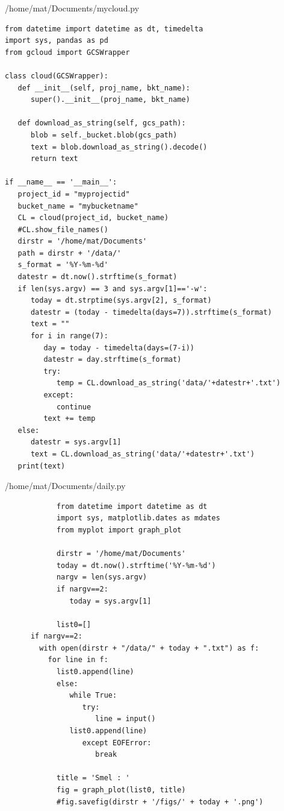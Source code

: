 \documentclass[12pt,a4j]{jsbook}
\begin{document}
\begin{spacing}{0.87}
\begin{itembox}[l]{/home/mat/Documents/mycloud.py}
\begin{verbatim}
from datetime import datetime as dt, timedelta
import sys, pandas as pd
from gcloud import GCSWrapper

class cloud(GCSWrapper):
   def __init__(self, proj_name, bkt_name):
      super().__init__(proj_name, bkt_name)

   def download_as_string(self, gcs_path):
      blob = self._bucket.blob(gcs_path)
      text = blob.download_as_string().decode()
      return text

if __name__ == '__main__':
   project_id = "myprojectid"
   bucket_name = "mybucketname"
   CL = cloud(project_id, bucket_name)
   #CL.show_file_names()
   dirstr = '/home/mat/Documents'
   path = dirstr + '/data/'
   s_format = '%Y-%m-%d'
   datestr = dt.now().strftime(s_format)
   if len(sys.argv) == 3 and sys.argv[1]=='-w':
      today = dt.strptime(sys.argv[2], s_format)
      datestr = (today - timedelta(days=7)).strftime(s_format)
      text = ""
      for i in range(7):
         day = today - timedelta(days=(7-i))
         datestr = day.strftime(s_format)
         try:
            temp = CL.download_as_string('data/'+datestr+'.txt')
         except:
            continue
         text += temp
   else:
      datestr = sys.argv[1]
      text = CL.download_as_string('data/'+datestr+'.txt')
   print(text)
\end{verbatim}
\end{itembox}
\end{spacing}

\begin{spacing}{0.87}
\begin{itembox}[l]{/home/mat/Documents/daily.py}
\begin{verbatim}
			from datetime import datetime as dt
			import sys, matplotlib.dates as mdates
			from myplot import graph_plot

			dirstr = '/home/mat/Documents'
			today = dt.now().strftime('%Y-%m-%d')
			nargv = len(sys.argv)
			if nargv==2:
			   today = sys.argv[1]

			list0=[]
      if nargv==2:
        with open(dirstr + "/data/" + today + ".txt") as f:
          for line in f:
            list0.append(line)
			else:
			   while True:
			      try:
			         line = input()
               list0.append(line)
			      except EOFError:
			         break

			title = 'Smel : '
			fig = graph_plot(list0, title)
			#fig.savefig(dirstr + '/figs/' + today + '.png')
\end{verbatim}
\end{itembox}
\end{spacing}
\end{document}

